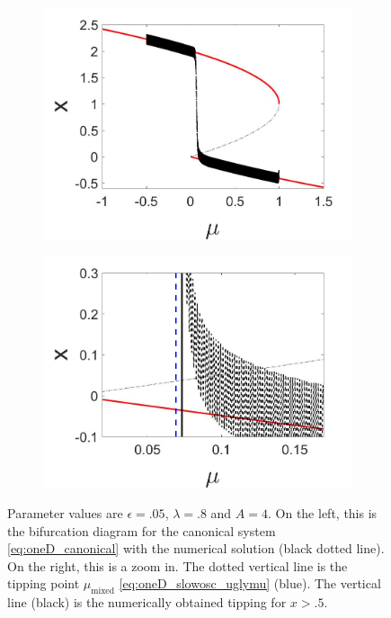 \begin{figure}[H]
\centering
\begin{subfigure}{.5\textwidth}
 \centering
 \includegraphics[width=\linewidth]{oneD/slowosc_bif_diagram_small.jpg}
 \caption{}
\end{subfigure}%
\begin{subfigure}{.5\textwidth}
 \centering
 \includegraphics[width=\linewidth]{oneD/slowosc_bif_diagram_small_zoom.jpg}
 \caption{}
\end{subfigure}
\caption{Parameter values are $\epsilon=.05$, $\lambda=.8$ and $A=4$. On the left, this is the bifurcation diagram for the canonical system \eqref{eq:oneD_canonical} with the numerical solution (black dotted line). On the right, this is a zoom in. The dotted vertical line is the tipping point $\mu_{\text{mixed}}$ \eqref{eq:oneD_slowosc_uglymu} (blue). The vertical line (black) is the numerically obtained tipping for $x>.5$.}
\label{fig:oneD_slowosc_numerical_small}
\end{figure}

